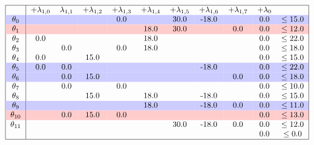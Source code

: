 \documentclass{article}
\begin{document}
    \[
        \begin{tabular}{ |c|c c c c c c c c c c| }
            \hline
            & +$\lambda_{1,0}$ & $\lambda_{1,1}$ & +$\lambda_{1,2}$ & +$\lambda_{1,3}$ & +$\lambda_{1,4}$ & +$\lambda_{1,5}$ & +$\lambda_{1,6}$ & +$\lambda_{1,7}$  & +$\lambda_{0}$ &  \\
            \rowcolor{blue!20}
            $\theta_{0}$ && & & 0.0 && 30.0 &-18.0 && 0.0& $\leq 15.0$ \\
            \rowcolor{red!20}
            $\theta_{1}$ && & & & 18.0 &30.0 && 0.0 &0.0& $\leq 12.0$ \\
            $\theta_{2}$ &0.0 && & & 18.0 && & & 0.0& $\leq 22.0$ \\
            $\theta_{3}$ && 0.0 && 0.0 &18.0 && & & 0.0& $\leq 18.0$ \\
            $\theta_{4}$ &0.0 && 15.0 && & & & & 0.0& $\leq 15.0$ \\
            \rowcolor{blue!20}
            $\theta_{5}$ &0.0 &0.0 && & & & -18.0 && 0.0& $\leq 22.0$ \\
            \rowcolor{blue!20}
            $\theta_{6}$ && 0.0 &15.0 && & & & 0.0 &0.0& $\leq 18.0$ \\
            $\theta_{7}$ && 0.0 && 0.0 && & & & 0.0& $\leq 10.0$ \\
            $\theta_{8}$ && & 15.0 && 18.0 && -18.0 && 0.0& $\leq 15.0$ \\
            \rowcolor{blue!20}
            $\theta_{9}$ && & & & 18.0 && -18.0 &0.0 &0.0& $\leq 11.0$ \\
            \rowcolor{red!20}
            $\theta_{10}$ && 0.0 &15.0 &0.0 && & & & 0.0& $\leq 13.0$ \\
            $\theta_{11}$ && & & & & 30.0 &-18.0 &0.0 &0.0& $\leq 12.0$ \\
            && & & & &  && & 0.0 & $\leq 0.0$ \\
            \hline
        \end{tabular}
    \]
\end{document}
